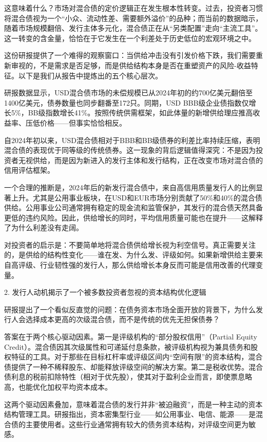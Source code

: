 \documentclass[11pt]{ctexart}
\begin{document}
这意味着什么？市场对混合债的定价逻辑正在发生根本性转变。过去，投资者习惯将混合债视为一个“小众、流动性差、需要额外溢价”的品种；而当前的数据暗示，随着市场规模翻倍、发行主体多元化，混合债正在从“另类配置”走向“主流工具”。这一转变的含金量，恰恰在于它发生在一个利差处于历史低位的宏观环境之中。

这份研报提供了一个难得的观察窗口：当供给冲击没有引发价格下跌，我们需要重新审视的，不是需求是否足够，而是供给结构本身是否在重塑资产的风险-收益特征。以下是我们从报告中提炼出的五个核心层次。

研报数据显示，USD混合债市场的未偿规模已从2024年初的约700亿美元翻倍至1400亿美元，债券数量也同步翻番至172只。同期，USD BBB级企业债指数仅增长5\%，BB级指数增长41\%。按照传统供需框架，如此体量的新增供给理应推高收益率、压低价格——但事实恰恰相反。

自2024年初以来，USD混合债相对于BBB和BB级债券的利差比率持续压缩，表明混合债的表现优于同等级的传统债券。这一现象的背后逻辑值得深究：不是因为投资者无视供给，而是因为新进入的发行主体和发行结构，正在改变市场对混合债的信用评估框架。

一个合理的推断是，2024年后的新发行混合债中，来自高信用质量发行人的比例显著上升。尤其是公用事业板块，在USD和EUR市场分别贡献了50\%和40\%的混合债供给。公用事业公司通常拥有稳定的现金流和监管保护，其发行的混合债天然具备更低的违约风险。因此，供给增长的同时，平均信用质量可能也在提升——这解释了为什么利差没有走阔。

对投资者的启示是：不要简单地将混合债供给增长视为利空信号。真正需要关注的，是供给的结构性变化——谁在发、为什么发、评级如何。如果新增供给主要来自高评级、行业韧性强的发行人，那么供给增长本身反而可能是信用改善的代理变量。

2. 发行人动机揭示了一个被多数投资者忽视的资本结构优化逻辑

研报提出了一个看似反直觉的问题：在债务资本市场全面开放的背景下，为什么发行人会选择成本更高的次级混合债，而不是传统的优先无担保债券？

答案在于两个核心驱动因素。第一是评级机构的“部分股权信用”（Partial Equity Credit）。混合债因其次级属性和可递延付息条款，被评级机构视为兼具债务和股权特征的工具。对于那些在目标杠杆率或评级区间内“空间有限”的资本结构，混合债提供了一种不稀释股东、却能释放评级空间的解决方案。第二是税收优势。混合债利息的税前扣除特性（相对于优先股），使其对于盈利企业而言，即使票息略高，也能优化加权平均资本成本。

这两个驱动因素叠加，意味着混合债的发行并非“被迫融资”，而是一种主动的资本结构管理工具。研报指出，资本密集型行业——如公用事业、电信、能源——是混合债的主要使用者。这些行业通常拥有较大的债务资本结构，对评级空间更为敏感。
\end{document}
